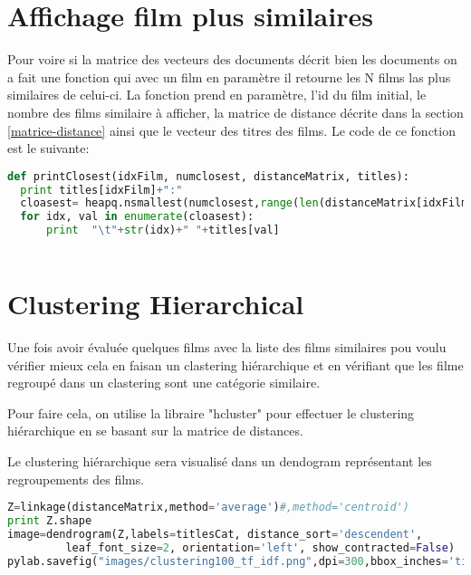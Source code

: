 \section{Affichage film plus similaires}

Pour voire si la matrice des vecteurs des documents décrit bien les documents on a fait une fonction qui avec un film en paramètre il retourne les N films las plus similaires de celui-ci.
La fonction prend en paramètre, l'id du film initial, le nombre des films similaire à afficher, la matrice de distance décrite dans la section \ref{matrice-distance} ainsi que le vecteur des titres des films.
Le code de ce fonction est le suivante:

\begin{lstlisting}[language=python]
def printClosest(idxFilm, numclosest, distanceMatrix, titles):
  print titles[idxFilm]+":"
  cloasest= heapq.nsmallest(numclosest,range(len(distanceMatrix[idxFilm])),distanceMatrix[idxFilm].take)
  for idx, val in enumerate(cloasest):
      print  "\t"+str(idx)+" "+titles[val]
  
\end{lstlisting}


\section{Clustering Hierarchical}

Une fois avoir évaluée quelques films avec la liste des films similaires pou voulu vérifier mieux  cela en faisan un clastering hiérarchique et en vérifiant que les filme regroupé dans un clastering sont une catégorie similaire.

Pour faire cela, on utilise la libraire "hcluster" pour effectuer le clustering hiérarchique en se basant sur la matrice de distances.

Le clustering hiérarchique sera visualisé dans un dendogram représentant les regroupements des films.

\begin{lstlisting}[language=python]
Z=linkage(distanceMatrix,method='average')#,method='centroid')
print Z.shape
image=dendrogram(Z,labels=titlesCat, distance_sort='descendent',
         leaf_font_size=2, orientation='left', show_contracted=False)
pylab.savefig("images/clustering100_tf_idf.png",dpi=300,bbox_inches='tight')	 	  
\end{lstlisting}

